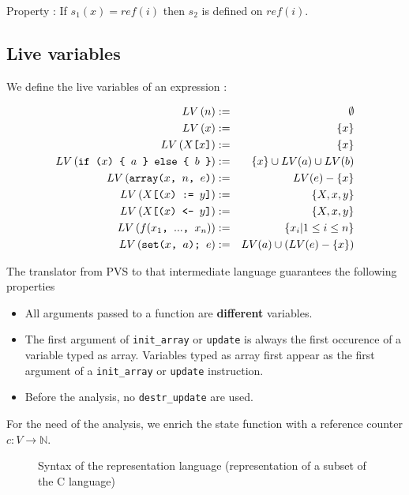 \documentclass[12pt,a4paper,titlepage]{article}
\newcommand{\cl}[1]{\texttt{#1}}
\newcommand{\N}{\mathbb{N}}
\begin{document}
Property :
If $s_1(x) = ref(i)$ then $s_2$ is defined on $ref(i)$.


\subsection{Live variables}

We define the live variables of an expression :

\begin{eqnarray*}
LV\left( n      \right) & := & \emptyset \\
LV\left( x      \right) & := & \{ x \} \\
LV\left( X\cl{[}x\cl{]} \right) & := & \{ x \} \\
LV\left( \cl{if (} x \cl{) \char'173 \ } a \cl{ \char'175 \ else \char'173 \ } b \cl{ \char'175 }  \right) & := & \{ x \} \cup LV(a) \cup LV(b) \\
LV\left( \cl{array(} x \cl{, } n \cl{, } e \cl{)} \right) & := & LV(e) - \{ x \} \\
LV\left( X \cl{[(} x \cl{) := } y \cl{]} \right) & := & \{ X, x, y \} \\
LV\left( X \cl{[(} x \cl{) <- } y \cl{]} \right) & := & \{ X, x, y \} \\
LV\left( f(x_1 \cl{, } ... \cl{, } x_n) \right) & := & \{ x_i | 1 \leq i \leq n \} \\
LV\left( \cl{set(} x \cl{, } a \cl{); } e \right) & := & LV(a) \cup \left( LV(e) - \{ x \} \right)
\end{eqnarray*}


The translator from PVS to that intermediate language guarantees the following properties 
\begin{itemize}
\item All arguments passed to a function are \textbf{different} variables.
\item The first argument of \cl{init\_array} or \cl{update} is always the first occurence of a variable typed as array. Variables typed as array first appear as the first argument of a \cl{init\_array} or \cl{update} instruction.
\item Before the analysis, no \cl{destr\_update} are used.
\end{itemize} 

For the need of the analysis, we enrich the state function with a reference counter $c:V \rightarrow \N$.





\newpage
\begin{figure}[!ht]

\caption{Syntax of the representation language (representation of a subset of the C language)}
\label{fig:Csyntax}
\end{figure}
\end{document}
